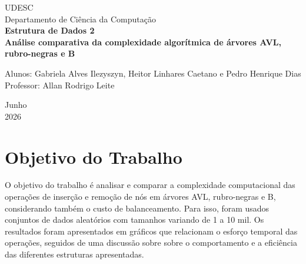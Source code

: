 \documentclass[a4paper, 12pt]{article}
\begin{document}

\begin{titlepage}
	\begin{center}
	
		\Huge{UDESC}\\
		\large{Departamento de Ciência da Computação}\\ 
		\vspace{15pt}
        \vspace{95pt}
        \textbf{\LARGE{Estrutura de Dados 2}}\\

		\textbf{Análise comparativa da complexidade algorítmica de árvores AVL, rubro-negras e B}
		\vspace{3,5cm}
	\end{center}
	
	\begin{flushleft}
		\begin{tabbing}
			Alunos: Gabriela Alves Ilezyszyn, Heitor Linhares Caetano e Pedro Henrique Dias\\
			Professor: Allan Rodrigo Leite\\
	      \setlength{\labelsep}{\leftmargin}
	\end{tabbing}
 \end{flushleft}
	\vspace{1cm}
	
	\begin{center}
		\vspace{\fill}
			 Junho\\
			 2026
			\end{center}
\end{titlepage}


\newpage
\newpage
\tableofcontents
\thispagestyle{empty}

\newpage
{}

\section{Objetivo do Trabalho}
O objetivo do trabalho é analisar e comparar a complexidade computacional
das operações de inserção e remoção de nós em árvores AVL, rubro-negras e B,
considerando também o custo de balanceamento. Para isso, foram usados conjuntos de dados
aleatórios com tamanhos variando de 1 a 10 mil. Os resultados foram apresentados
em gráficos que relacionam o esforço temporal das operações, seguidos de uma discussão
sobre sobre o comportamento e a eficiência das diferentes estruturas apresentadas.
\end{document}
